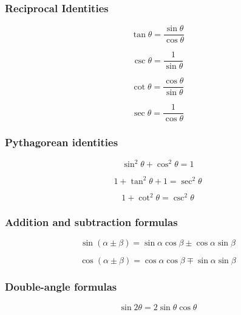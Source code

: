 \documentclass[12pt]{book}
\begin{document}
\subsubsection{Reciprocal Identities}

\begin{equation}
	\tan \theta = \frac{\sin\theta}{\cos \theta}
\end{equation}

\begin{equation} 
	\csc \theta = \frac{1}{\sin \theta}
\end{equation}

\begin{equation} 
	\cot \theta = \frac{\cos \theta}{\sin \theta}
\end{equation}

\begin{equation} 
	\sec \theta = \frac{1}{\cos \theta}
\end{equation}

\subsubsection{Pythagorean identities}

\begin{equation}
	\sin^2 \theta + \cos^2 \theta = 1
\end{equation}

\begin{equation}
	1 + \tan^2 \theta + 1 = \sec^2 \theta
\end{equation}

\begin{equation}
	1 + \cot^2 \theta = \csc^2 \theta
\end{equation}

\subsubsection{Addition and subtraction formulas}
\begin{equation} 
	\sin(\alpha \pm \beta) = \sin \alpha \cos \beta \pm \cos \alpha \sin \beta
\end{equation}

\begin{equation} 
	\cos(\alpha \pm \beta) = \cos \alpha \cos \beta \mp \sin \alpha \sin \beta
\end{equation}

\subsubsection{Double-angle formulas}
\begin{equation}
	\sin 2\theta = 2 \sin \theta \cos \theta
\end{equation}
\end{document}
